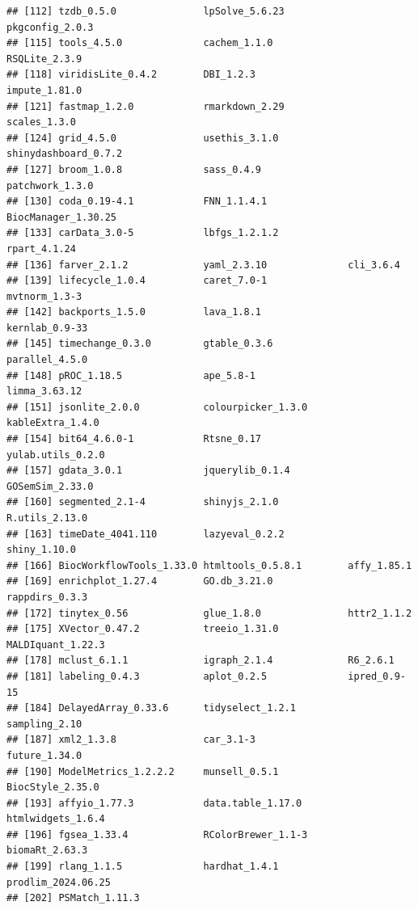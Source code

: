 \documentclass[9pt,a4paper,]{extarticle}
\begin{document}
\begin{verbatim}
## [112] tzdb_0.5.0               lpSolve_5.6.23           pkgconfig_2.0.3         
## [115] tools_4.5.0              cachem_1.1.0             RSQLite_2.3.9           
## [118] viridisLite_0.4.2        DBI_1.2.3                impute_1.81.0           
## [121] fastmap_1.2.0            rmarkdown_2.29           scales_1.3.0            
## [124] grid_4.5.0               usethis_3.1.0            shinydashboard_0.7.2    
## [127] broom_1.0.8              sass_0.4.9               patchwork_1.3.0         
## [130] coda_0.19-4.1            FNN_1.1.4.1              BiocManager_1.30.25     
## [133] carData_3.0-5            lbfgs_1.2.1.2            rpart_4.1.24            
## [136] farver_2.1.2             yaml_2.3.10              cli_3.6.4               
## [139] lifecycle_1.0.4          caret_7.0-1              mvtnorm_1.3-3           
## [142] backports_1.5.0          lava_1.8.1               kernlab_0.9-33          
## [145] timechange_0.3.0         gtable_0.3.6             parallel_4.5.0          
## [148] pROC_1.18.5              ape_5.8-1                limma_3.63.12           
## [151] jsonlite_2.0.0           colourpicker_1.3.0       kableExtra_1.4.0        
## [154] bit64_4.6.0-1            Rtsne_0.17               yulab.utils_0.2.0       
## [157] gdata_3.0.1              jquerylib_0.1.4          GOSemSim_2.33.0         
## [160] segmented_2.1-4          shinyjs_2.1.0            R.utils_2.13.0          
## [163] timeDate_4041.110        lazyeval_0.2.2           shiny_1.10.0            
## [166] BiocWorkflowTools_1.33.0 htmltools_0.5.8.1        affy_1.85.1             
## [169] enrichplot_1.27.4        GO.db_3.21.0             rappdirs_0.3.3          
## [172] tinytex_0.56             glue_1.8.0               httr2_1.1.2             
## [175] XVector_0.47.2           treeio_1.31.0            MALDIquant_1.22.3       
## [178] mclust_6.1.1             igraph_2.1.4             R6_2.6.1                
## [181] labeling_0.4.3           aplot_0.2.5              ipred_0.9-15            
## [184] DelayedArray_0.33.6      tidyselect_1.2.1         sampling_2.10           
## [187] xml2_1.3.8               car_3.1-3                future_1.34.0           
## [190] ModelMetrics_1.2.2.2     munsell_0.5.1            BiocStyle_2.35.0        
## [193] affyio_1.77.3            data.table_1.17.0        htmlwidgets_1.6.4       
## [196] fgsea_1.33.4             RColorBrewer_1.1-3       biomaRt_2.63.3          
## [199] rlang_1.1.5              hardhat_1.4.1            prodlim_2024.06.25      
## [202] PSMatch_1.11.3
\end{verbatim}
\end{document}
